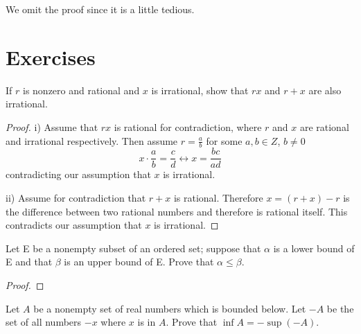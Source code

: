 \documentclass{tufte-book}
\theoremstyle{definition}
\numberwithin{section}{chapter}
\begin{document}
We omit the proof since it is a little tedious.



\section{Exercises}

  If $r$ is nonzero and rational and $x$ is irrational, show that $rx$ and $r+x$ are also irrational. 

\begin{proof}
	i) Assume that $rx$ is rational for contradiction, where $r$ and $x$ are rational and irrational respectively.  Then assume $r = \frac{a}{b}$
 for some $a,b \in Z$, $b \neq 0$
 \[x \cdot \frac{a}{b} = \frac{c}{d} \leftrightarrow x = \frac{bc}{ad}\]
 contradicting our assumption that $x$ is irrational.
 
 ii) Assume for contradiction that $r+x$ is rational. Therefore $x = (r+x) - r$ is the difference between two rational numbers and therefore is rational itself.  This contradicts our assumption that $x$ is irrational.
 \end{proof}
 
  Let E be a nonempty subset of an ordered set; suppose that $\alpha$ is a lower bound of E and that $\beta$ is an upper bound of E.  Prove that $\alpha \leq \beta$.

\begin{proof}
\end{proof}


  Let $A$ be a nonempty set of real numbers which is bounded below.  Let $-A$ be the set of all numbers $-x$ where $x$ is in $A$.  Prove that $\inf A = -\sup(-A)$.
\end{document}
